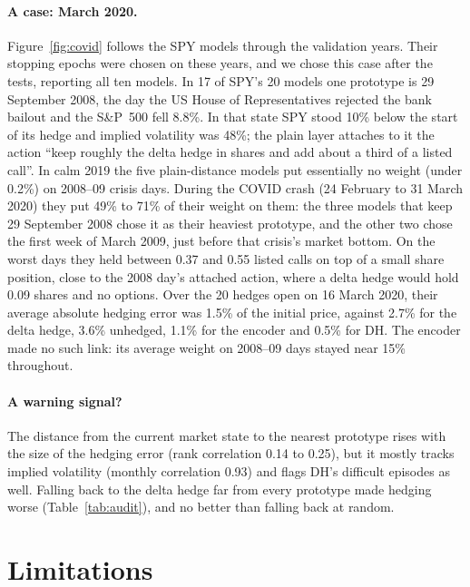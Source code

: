 \documentclass[runningheads]{llncs}
\begin{document}
\paragraph{A case: March 2020.} Figure~\ref{fig:covid} follows the SPY models through the validation
years. Their stopping epochs were chosen on these years, and we chose this case after the tests, reporting
all ten models. In 17 of SPY's 20 models one prototype is 29 September 2008, the day the US House of
Representatives rejected the bank bailout and the S\&P~500 fell 8.8\%. In that state SPY stood 10\% below
the start of its hedge and implied volatility was 48\%; the plain layer attaches to it the action ``keep
roughly the delta hedge in shares and add about a third of a listed call''. In calm 2019 the five
plain-distance models put essentially no weight (under 0.2\%) on 2008--09 crisis days. During the COVID crash
(24 February to 31 March 2020) they put 49\% to 71\% of their weight on them: the three models that keep
29 September 2008 chose it as their heaviest prototype, and the other two chose the first week of March
2009, just before that crisis's market bottom. On the worst days they held between 0.37 and 0.55 listed calls
on top of a small share position, close to the 2008 day's attached action, where a delta hedge would hold
0.09 shares and no options. Over the 20 hedges open on 16 March 2020, their average absolute hedging error
was 1.5\% of the initial price, against 2.7\% for the delta hedge, 3.6\% unhedged, 1.1\% for the encoder and
0.5\% for DH. The encoder made no such link: its average weight on 2008--09 days stayed near 15\% throughout.

\paragraph{A warning signal?} The distance from the current market state to the nearest prototype rises
with the size of the hedging error (rank correlation 0.14 to 0.25), but it mostly tracks implied volatility
(monthly correlation 0.93) and flags DH's difficult episodes as well. Falling back to the delta hedge far
from every prototype made hedging worse (Table~\ref{tab:audit}), and no better than falling back at random.

\section{Limitations}
\end{document}
